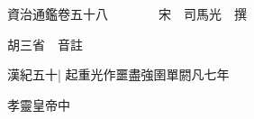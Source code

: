 






























































資治通鑑卷五十八　　　　宋　司馬光　撰

胡三省　音註

漢紀五十|{
	起重光作噩盡強圉單閼凡七年}


孝靈皇帝中

